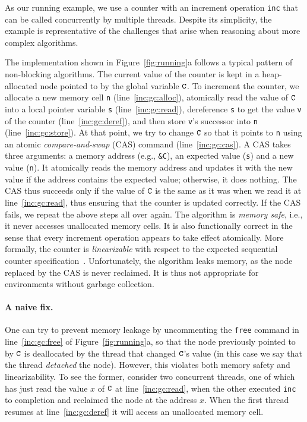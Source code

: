 As our running example, we use a counter with an increment operation {\tt inc}
that can be called concurrently by multiple threads. Despite its simplicity, the
example is representative of the challenges that arise when reasoning about
more complex algorithms.


The implementation shown in Figure~\ref{fig:running}a follows a typical pattern
of non-blocking algorithms.  The current value of the counter is kept in a
heap-allocated node pointed to by the global variable $\texttt{C}$.  To increment the
counter, we allocate a new memory cell {\tt n} (line~\ref{inc:gc:alloc}),
atomically read the value of $\texttt{C}$ into a local pointer variable \texttt{s}
(line~\ref{inc:gc:read}), dereference \texttt{s} to get the value \texttt{v} of
the counter (line~\ref{inc:gc:deref}), and then store \texttt{v}'s successor
into {\tt n} (line~\ref{inc:gc:store}).  At that point, we try to change $\texttt{C}$
so that it points to {\tt n} using an atomic \emph{compare-and-swap} (CAS)
command (line~\ref{inc:gc:cas}). A CAS takes three arguments: a memory address
(e.g., \verb|&C|), an expected value ({\tt s}) and a new value ({\tt n}). It
atomically reads the memory address and updates it with the new value if the
address contains the expected value; otherwise, it does nothing. The CAS thus
succeeds only if the value of $\texttt{C}$ is the same as it was when we read it at
line~\ref{inc:gc:read}, thus ensuring that the counter is updated correctly. If
the CAS fails, we repeat the above steps all over again.
%
%
The algorithm is \emph{memory safe}, i.e., it never accesses unallocated memory
cells. It is also functionally correct in the sense that every increment
operation appears to take effect atomically.  More formally, the counter is
\emph{linearizable} with respect to the expected sequential counter
specification~\cite{linearizability}. Unfortunately, the algorithm leaks memory,
as the node replaced by the CAS is never reclaimed. It is thus not appropriate
for %
environments without garbage collection.
 
\paragraph{A naive fix.} One can try to prevent memory leakage by uncommenting
the {\tt free} command in line~\ref{inc:gc:free} of Figure~\ref{fig:running}a,
so that the node previously pointed to by $\texttt{C}$ is deallocated by the thread
that changed $\texttt{C}$'s value (in this case we say that the thread {\em
  detached} the node). However, this violates both memory safety and
linearizability. To see the former, consider two concurrent threads, one of
which has just read the value $x$ of $\texttt{C}$ at line~\ref{inc:gc:read}, when the
other executed {\tt inc} to completion and reclaimed the node at the address
$x$. When the first thread resumes at line~\ref{inc:gc:deref} it will access an
unallocated memory cell.

